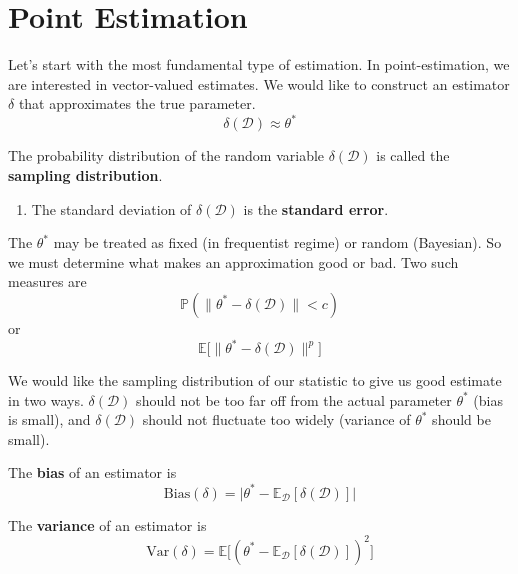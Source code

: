 \section{Point Estimation}

  Let's start with the most fundamental type of estimation. In point-estimation, we are interested in vector-valued estimates. We would like to construct an estimator $\delta$ that approximates the true parameter. 
  \begin{equation}
    \delta(\mathcal{D}) \approx \theta^\ast
  \end{equation} 

  \begin{definition}
    The probability distribution of the random variable $\delta(\mathcal{D})$ is called the \textbf{sampling distribution}. 
    \begin{enumerate}
      \item The standard deviation of $\delta(\mathcal{D})$ is the \textbf{standard error}. 
    \end{enumerate}
  \end{definition}

  The $\theta^\ast$ may be treated as fixed (in frequentist regime) or random (Bayesian). So we must determine what makes an approximation good or bad. Two such measures are 
  \begin{equation}
    \mathbb{P}( \|\theta^\ast - \delta(\mathcal{D}) \| < c)
  \end{equation} 
  or 
  \begin{equation}
    \mathbb{E} \big[ \| \theta^\ast - \delta(\mathcal{D}) \|^p \big]
  \end{equation} 

  We would like the sampling distribution of our statistic to give us good estimate in two ways. $\delta(\mathcal{D})$ should not be too far off from the actual parameter $\theta^\ast$ (bias is small), and $\delta(\mathcal{D})$ should not fluctuate too widely (variance of $\theta^\ast$ should be small). 

  \begin{definition}
    The \textbf{bias} of an estimator is 
    \begin{equation}
      \mathrm{Bias}(\delta) = \big| \theta^\ast -\mathbb{E}_{\mathcal{D}}[\delta(\mathcal{D})] \big|
    \end{equation}
  \end{definition} 

  \begin{definition}
    The \textbf{variance} of an estimator is 
    \begin{equation}
      \mathrm{Var}(\delta) = \mathbb{E} \big[ (\theta^\ast - \mathbb{E}_{\mathcal{D}}[\delta(\mathcal{D})])^2 \big]
    \end{equation}
  \end{definition}


